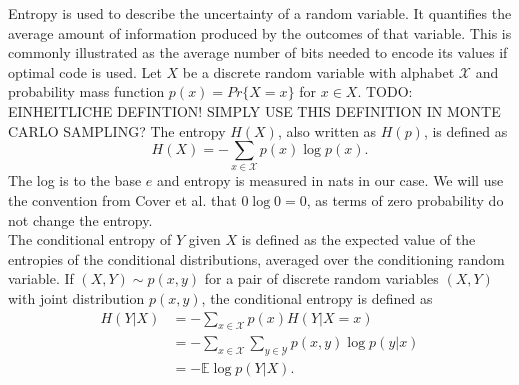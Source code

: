 Entropy is used to describe the uncertainty of a random variable. It quantifies the average amount of information produced by the outcomes of that variable. This is commonly illustrated as the average number of bits needed to encode its values if optimal code is used. Let $X$ be a discrete random variable with alphabet $\mathcal{X}$ and probability mass function $p(x)=Pr\{X=x\}$ for $x\in X$. TODO: EINHEITLICHE DEFINTION! SIMPLY USE THIS DEFINITION IN MONTE CARLO SAMPLING?
The entropy $H(X)$, also written as $H(p)$, is defined as
\begin{equation}
    H(X) = -\sum_{x \in \mathcal{X}} p(x) \log p(x).
\end{equation}
The log is to the base $e$ and entropy is measured in nats in our case. We will use the convention from Cover et al. \cite{Cover2005} that $0 \log 0 = 0$, as terms of zero probability do not change the entropy. %
\\
The conditional entropy of $Y$ given $X$ is defined as the expected value of the entropies of the conditional distributions, averaged over the conditioning random variable. If $(X,Y) \sim p(x,y)$ for a pair of discrete random variables $(X,Y)$ with joint distribution $p(x,y)$, the conditional entropy is defined as
\begin{align}
    H(Y|X)&= -\sum_{x \in \mathcal{X}} p(x) H(Y|X=x) \\
    &= - \sum_{x \in \mathcal{X}} \sum_{y \in \mathcal{Y}}p(x,y) \log p(y|x) \\
    &= -\mathbb{E} \log p(Y|X).
\end{align}


